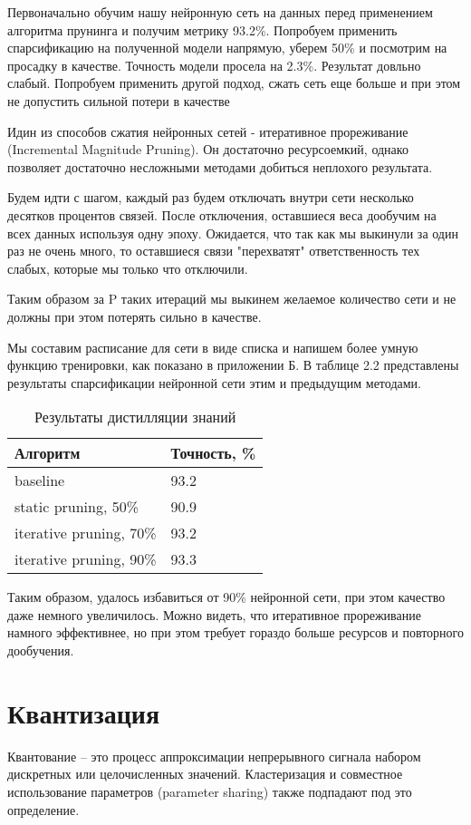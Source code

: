 \documentclass[oneside,final,12pt]{extreport}
\begin{document}
Первоначально обучим нашу нейронную сеть на данных перед применением алгоритма прунинга и получим метрику 93.2\%. Попробуем применить спарсификацию на полученной модели напрямую, уберем 50\% и посмотрим на просадку в качестве. Точность модели просела на 2.3\%. Результат довльно слабый. Попробуем применить другой подход, сжать сеть еще больше и при этом не допустить сильной потери в качестве

Идин из способов сжатия нейронных сетей - итеративное прореживание (Incremental Magnitude Pruning). Он достаточно ресурсоемкий, однако позволяет достаточно несложными методами добиться неплохого результата.

Будем идти с шагом, каждый раз будем отключать внутри сети несколько десятков процентов связей. После отключения, оставшиеся веса дообучим на всех данных используя одну эпоху. Ожидается, что так как мы выкинули за один раз не очень много, то оставшиеся связи "перехватят" ответственность тех слабых, которые мы только что отключили.

Таким образом за P таких итераций мы выкинем желаемое количество сети и не должны при этом потерять сильно в качестве.

Мы составим расписание для сети в виде списка и напишем более умную функцию тренировки, как показано в приложении Б. В таблице 2.2 представлены результаты спарсификации нейронной сети этим и предыдущим методами.

\begin{table}[H]
\caption{Результаты дистилляции знаний}
\label{table_1.1}
\begin{tabularx}{\textwidth}{|X|X|} %
\hline
Алгоритм & Точность, \% \\ \hline
baseline & 93.2 \\ \hline 
static pruning, 50\% &  90.9\\ \hline 
iterative pruning, 70\% & 93.2 \\ \hline 
iterative pruning, 90\% & 93.3 \\ \hline 
\end{tabularx}
\end{table}

Таким образом, удалось избавиться от 90\% нейронной сети, при этом качество даже немного увеличилось. Можно видеть, что итеративное прореживание намного эффективнее, но при этом требует гораздо больше ресурсов и повторного дообучения.

\chapter{Квантизация}
Квантование – это процесс аппроксимации непрерывного сигнала набором дискретных или целочисленных значений. Кластеризация и совместное использование параметров (parameter sharing) также подпадают под это определение. 
\end{document}
